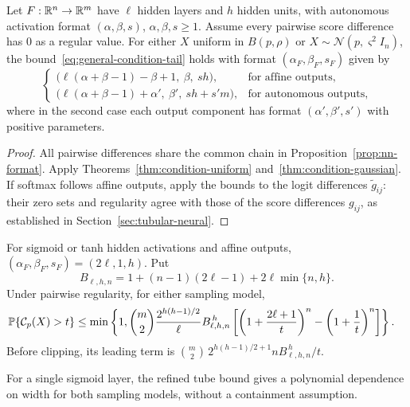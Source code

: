 \begin{corollary}\label{cor:nn-condition}
Let $F:\mathbb{R}^n\to\mathbb{R}^m$ have $\ell$ hidden layers and $h$ hidden units, with autonomous activation format $(\alpha,\beta,s)$, $\alpha,\beta,s\ge1$. Assume every pairwise score difference has $0$ as a regular value. For either $X$ uniform in $B(p,\rho)$ or $X\sim\mathcal N(p,\varsigma^2 I_n)$, the bound~\eqref{eq:general-condition-tail} holds with format $(\alpha_F,\beta_F,s_F)$ given by
\[
\begin{cases}
\bigl(\ell(\alpha+\beta-1)-\beta+1,\ \beta,\ sh\bigr),
&\text{for affine outputs},\\
\bigl(\ell(\alpha+\beta-1)+\alpha',\ \beta',\ sh+s'm\bigr),
&\text{for autonomous outputs},
\end{cases}
\]
where in the second case each output component has format $(\alpha',\beta',s')$ with positive parameters.
\end{corollary}

\begin{proof}
All pairwise differences share the common chain in Proposition~\ref{prop:nn-format}. Apply Theorems~\ref{thm:condition-uniform} and~\ref{thm:condition-gaussian}. If softmax follows affine outputs, apply the bounds to the logit differences $\widetilde g_{ij}$: their zero sets and regularity agree with those of the score differences $g_{ij}$, as established in Section~\ref{sec:tubular-neural}.
\end{proof}

\begin{example}\label{ex:sigmoid-condition}
For sigmoid or tanh hidden activations and affine outputs, $(\alpha_F,\beta_F,s_F)=(2\ell,1,h)$. Put
\[
B_{\ell,h,n}=1+(n-1)(2\ell-1)+2\ell\min\{n,h\}.
\]
Under pairwise regularity, for either sampling model,
\begin{align*}
\operatorname*{\mathbb{P}}\{\mathcal{C}_p(X)>t\}
&\le\min\left\{1,\binom m2
\frac{2^{h(h-1)/2}}{\ell}B_{\ell,h,n}^{\,h}
\left[\left(1+\frac{2\ell+1}{t}\right)^n
-\left(1+\frac1t\right)^n\right]\right\}.
\end{align*}
Before clipping, its leading term is
$\binom m2\,2^{h(h-1)/2+1}nB_{\ell,h,n}^{\,h}/t$.
\end{example}

For a single sigmoid layer, the refined tube bound gives a polynomial dependence on width for both sampling models, without a containment assumption.

